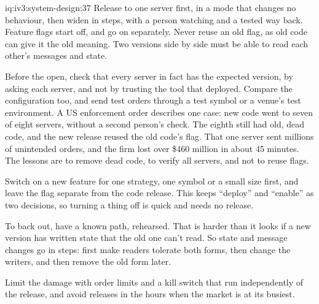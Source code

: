 \begin{solution}{iq:iv3:system-design:37}
Release to one server first, in a mode that changes no behaviour, then widen in steps, with a person watching and a tested way back. Feature flags start off, and go on separately. Never reuse an old flag, as old code can give it the old meaning. Two versions side by side must be able to read each other's messages and state.

Before the open, check that every server in fact has the expected version, by asking each server, and not by trusting the tool that deployed. Compare the configuration too, and send test orders through a test symbol or a venue's test environment. A US enforcement order describes one case: new code went to seven of eight servers, without a second person's check. The eighth still had old, dead code, and the new release reused the old code's flag. That one server sent millions of unintended orders, and the firm lost over \$460 million in about 45 minutes. The lessons are to remove dead code, to verify all servers, and not to reuse flags.

Switch on a new feature for one strategy, one symbol or a small size first, and leave the flag separate from the code release. This keeps ``deploy'' and ``enable'' as two decisions, so turning a thing off is quick and needs no release.

To back out, have a known path, rehearsed. That is harder than it looks if a new version has written state that the old one can't read. So state and message changes go in steps: first make readers tolerate both forms, then change the writers, and then remove the old form later.

Limit the damage with order limits and a kill switch that run independently of the release, and avoid releases in the hours when the market is at its busiest.

\end{solution}

